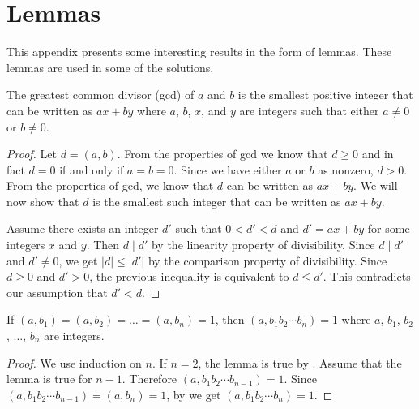 \appendix
\chapter{Lemmas}

This appendix presents some interesting results in the form of lemmas.
These lemmas are used in some of the solutions.


\begin{lemma}
  The greatest common divisor (gcd) of \( a \) and \( b \) is the
  smallest positive integer that can be written as \( ax + by \) where
  \( a \), \( b \), \( x \), and \( y \) are integers such that either
  \( a \ne 0 \) or \( b \ne 0 \).
\end{lemma}

\begin{proof}
  Let \( d = (a, b) \). From the properties of gcd we know that \( d
  \ge 0 \) and in fact \( d = 0 \) if and only if \( a = b = 0 \).
  Since we have either \( a \) or \( b \) as nonzero, \( d > 0 \).
  From the properties of gcd, we know that \( d \) can be written as
  \( ax + by \). We will now show that \( d \) is the smallest such
  integer that can be written as \( ax + by \).

  Assume there exists an integer \( d' \) such that \( 0 < d' < d \)
  and \( d' = ax + by \) for some integers \( x \) and \( y \). Then
  \( d \mid d' \) by the linearity property of divisibility. Since \(
  d \mid d' \) and \( d' \ne 0 \), we get \( \lvert d \rvert \le
  \lvert d' \rvert \) by the comparison property of divisibility.
  Since \( d \ge 0 \) and \( d' > 0 \), the previous inequality is
  equivalent to \( d \le d' \). This contradicts our assumption that
  \( d' < d \).
\end{proof}


\begin{lemma}
  If \( (a, b_1) = (a, b_2) = \dots = (a, b_n) = 1 \), then \( (a, b_1
  b_2 \cdots b_n) = 1 \) where \( a \), \( b_1 \), \( b_2 \), \( \dots
  \), \( b_n \) are integers.
\end{lemma}

\begin{proof}
  We use induction on \( n \). If \( n = 2 \), the lemma is true by
  . Assume that the lemma is true for \( n - 1 \).
  Therefore \( (a, b_1 b_2 \cdots b_{n - 1}) = 1 \). Since \( (a, b_1
  b_2 \cdots b_{n - 1}) = (a, b_n) = 1 \), by  we get \(
  (a, b_1 b_2 \cdots b_n ) = 1 \).
\end{proof}


